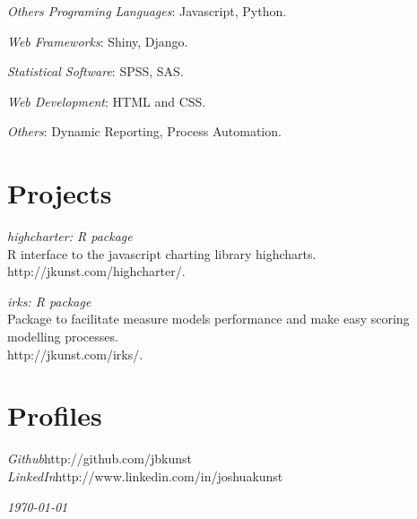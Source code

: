 \documentclass[margin]{res}
\begin{document}
\begin{resume}
    {\sl Others Programing Languages}: Javascript, Python.

    {\sl Web Frameworks}: Shiny, Django.

    {\sl Statistical Software}: SPSS, SAS.
    
    {\sl Web Development}: HTML and CSS.
    
    {\sl Others}: Dynamic Reporting, Process Automation.

\vspace{1cm}

\newpage

\section{Projects}


    {\sl highcharter: R package}\\
    R interface to the javascript charting library highcharts.\\
    http://jkunst.com/highcharter/.
    
    {\sl irks: R package}\\
    Package to facilitate measure models performance and make easy scoring modelling processes.\\
    http://jkunst.com/irks/.
    

\vspace{1cm}

\section{Profiles}
    
    {\sl Github}\hfill http://github.com/jbkunst\\
    
    {\sl LinkedIn}\hfill http://www.linkedin.com/in/joshuakunst

\vspace{1cm}


\end{resume}

\vspace{0.5cm}

\hfill {\sl \today}
\end{document}
